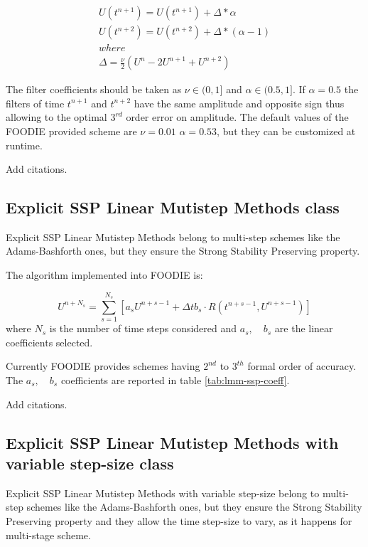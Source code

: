\begin{equation}
  \begin{matrix}
    U\left(t^{n+1}\right) = U\left(t^{n+1}\right) + \Delta * \alpha     \\
    U\left(t^{n+2}\right) = U\left(t^{n+2}\right) + \Delta * (\alpha-1) \\
    where \\
    \Delta = \frac{\nu}{2}(U^{n} - 2 U^{n+1} + U^{n+2})
  \end{matrix}
\label{eq:leapfrog-RAW}
\end{equation}

The filter coefficients should be taken as $\nu \in (0,1]$ and $\alpha \in (0.5,1]$. If $\alpha=0.5$ the filters of time $t^{n+1}$ and $t^{n+2}$ have the same amplitude and opposite sign thus allowing to the optimal $3^{rd}$ order error on amplitude. The default values of the FOODIE provided scheme are $\nu=0.01$ $\alpha=0.53$, but they can be customized at runtime.

{\color{red} Add citations.}

\subsection{Explicit SSP Linear Mutistep Methods class}

Explicit SSP Linear Mutistep Methods belong to multi-step schemes like the Adams-Bashforth ones, but they ensure the Strong Stability Preserving property.

The algorithm implemented into FOODIE is:

\begin{equation}
U^{n+N_s} = \sum_{s=1}^{N_s}{\left[a_s U^{n+s-1} + \Delta t b_s \cdot R(t^{n+s-1}, U^{n+s-1}) \right]}
\label{eq:lmm-ssp}
\end{equation}
where $N_s$ is the number of time steps considered and $a_s, \quad b_s$ are the linear coefficients selected.

Currently FOODIE provides schemes having $2^{nd}$ to $3^{th}$ formal order of accuracy. The $a_s , \quad b_s$ coefficients are reported in table \ref{tab:lmm-ssp-coeff}.

{\color{red} Add citations.}

\subsection{Explicit SSP Linear Mutistep Methods with variable step-size class}

Explicit SSP Linear Mutistep Methods with variable step-size belong to multi-step schemes like the Adams-Bashforth ones, but they ensure the Strong Stability Preserving property and they allow the time step-size to vary, as it happens for multi-stage scheme.

